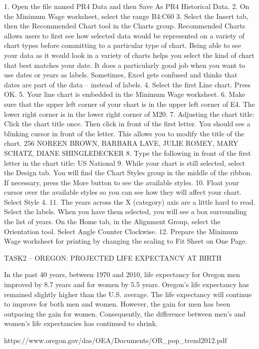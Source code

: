 1. Open the file named PR4 Data and then Save As PR4 Historical Data.
2. On the Minimum Wage worksheet, select the range B4:C60
3. Select the Insert tab, then the Recommended Chart tool in the Charts group.
Recommended Charts allows users to first see how selected data would be represented on a
variety of chart types before committing to a particular type of chart. Being able to see your data
as it would look in a variety of charts helps you select the kind of chart that best matches your
date.
It does a particularly good job when you want to use dates or years as labels. Sometimes, Excel
gets confused and thinks that dates are part of the data – instead of labels.
4. Select the first Line chart. Press OK.
5. Your line chart is embedded in the Minimum Wage worksheet.
6. Make sure that the upper left corner of your chart is in the upper left corner of E4. The lower
right corner is in the lower right corner of M20.
7. Adjusting the chart title: Click the chart title once. Then click in front of the first letter. You
should see a blinking cursor in front of the letter. This allows you to modify the title of the chart.
256 NOREEN BROWN, BARBARA LAVE, JULIE ROMEY, MARY SCHATZ, DIANE SHINGLEDECKER
8. Type the following in front of the first letter in the chart title: US National
9. While your chart is still selected, select the Design tab. You will find the Chart Styles group in
the middle of the ribbon. If necessary, press the More button to see the available styles.
10. Float your cursor over the available styles so you can see how they will affect your chart. Select
Style 4.
11. The years across the X (category) axis are a little hard to read.
Select the labels. When you have them selected, you will see a box surrounding the list of years.
On the Home tab, in the Alignment Group, select the Orientation tool. Select Angle Counter
Clockwise.
12. Prepare the Minimum Wage worksheet for printing by changing the scaling to Fit Sheet on
One Page.

TASK2 – OREGON: PROJECTED LIFE EXPECTANCY AT BIRTH

In the past 40 years, between 1970 and 2010, life expectancy for Oregon men improved by 8.7 years
and for women by 5.5 years. Oregon’s life expectancy has remained slightly higher than the U.S.
average. The life expectancy will continue to improve for both men and women. However, the gain
for men has been outpacing the gain for women. Consequently, the difference between men’s and
women’s life expectancies has continued to shrink.

https://www.oregon.gov/das/OEA/Documents/OR_pop_trend2012.pdf

